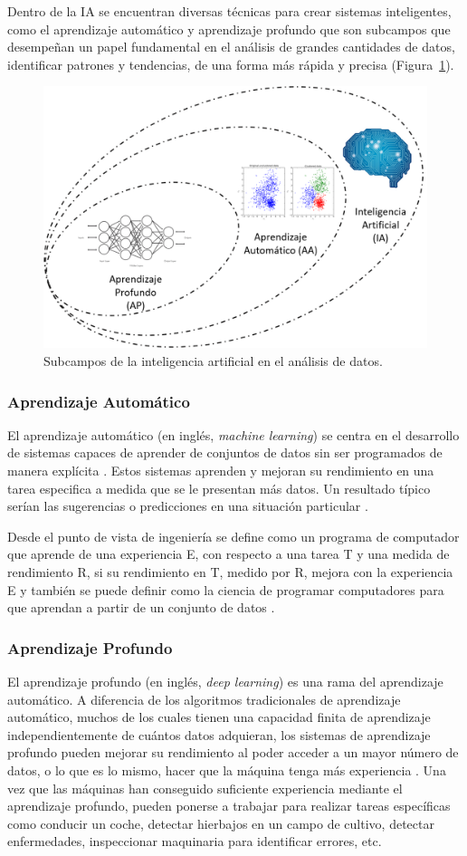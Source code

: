 Dentro de la IA se encuentran diversas técnicas para crear sistemas inteligentes, como el aprendizaje automático y aprendizaje profundo que son subcampos que desempeñan un papel fundamental en el análisis de grandes cantidades de datos, identificar patrones y tendencias, de una forma más rápida y precisa (Figura~\ref{fig:IA_AA_A}).

  \begin{figure}[!h]
     \centering
     \includegraphics[width=.5\textwidth]{Imagenes/IA_AA_AP.png}
     \caption{Subcampos de la inteligencia artificial en el análisis de datos.}
     \label{fig:IA_AA_A}
 \end{figure}


\subsubsection{Aprendizaje Automático}

El aprendizaje automático (en inglés, \textit{machine learning}) se centra en el desarrollo de sistemas capaces de aprender de conjuntos de datos sin ser programados de manera explícita \citep{mitchell1997does}. Estos sistemas aprenden y mejoran su rendimiento en una tarea especifica a medida que se le presentan más datos. Un resultado típico serían las sugerencias o predicciones en una situación particular \citep{vieira2020main}.

Desde el punto de vista de ingeniería se define como un programa de computador que aprende de una experiencia E, con respecto a una tarea T y una medida de rendimiento R, si su rendimiento en T, medido por R, mejora con la experiencia E y también se puede definir como la ciencia de programar computadores para que aprendan a partir de un conjunto de datos \citep{geron2020aprende}.

\subsubsection{Aprendizaje Profundo}

El aprendizaje profundo (en inglés, \textit{deep learning}) es una rama del aprendizaje automático. A diferencia de los algoritmos tradicionales de aprendizaje automático, muchos de los cuales tienen una capacidad finita de aprendizaje independientemente de cuántos datos adquieran, los sistemas de aprendizaje profundo pueden mejorar su rendimiento al poder acceder a un mayor número de datos, o lo que es lo mismo, hacer que la máquina tenga más experiencia \citep{shinde2018review}. Una vez que las máquinas han conseguido suficiente experiencia mediante el aprendizaje profundo, pueden ponerse a trabajar para realizar tareas específicas como conducir un coche, detectar hierbajos en un campo de cultivo, detectar enfermedades, inspeccionar maquinaria para identificar errores, etc.

